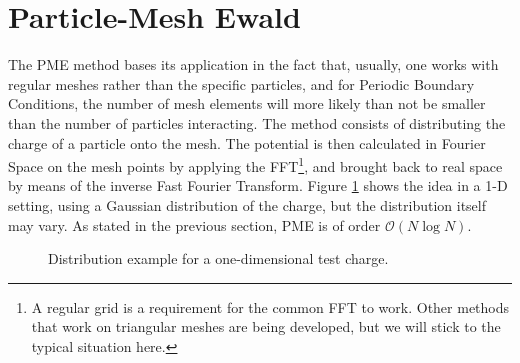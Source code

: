 \documentclass[a4paper, 12pt, notitlepage]{article}
\begin{document}
\section{Particle-Mesh Ewald}\label{sec:PME}
The PME method bases its application in the fact that, usually, one works with regular meshes rather than the specific particles, and for Periodic Boundary Conditions, the number of mesh elements will more likely than not be smaller than the number of particles interacting. The method consists of distributing the charge of a particle onto the mesh. The potential is then calculated in Fourier Space on the mesh points by applying the FFT\footnote{A regular grid is a requirement for the common FFT to work. Other methods that work on triangular meshes are being developed, but we will stick to the typical situation here.}, and brought back to real space by means of the inverse Fast Fourier Transform. Figure \ref{fig:fig1} shows the idea in a 1-D setting, using a Gaussian distribution of the charge, but the distribution itself may vary. As stated in the previous section, PME is of order $\mathcal{O}(N\log N)$.
\begin{figure}[h]
	\centering
	
	\vspace{2.5pt}
	\caption{Distribution example for a one-dimensional test charge.}\label{fig:fig1}
\end{figure}
\end{document}
